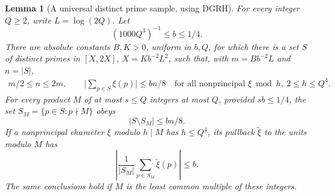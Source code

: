 \documentclass[11pt]{article}
\newtheorem{lemma}[theorem]{Lemma}
\theoremstyle{definition}\newtheorem{remark}[theorem]{Remark}
\newcommand{\abs}[1]{\lvert #1\rvert}
\newcommand{\GRH}{\textup{DGRH}}
\begin{document}
\begin{lemma}[A universal distinct prime sample, using \GRH]\label{lem:sample}
For every integer $Q\ge2$, write $L=\log(2Q)$. Let
\[
 (1000Q^3)^{-1}\le b\le1/4.
\]
There are absolute constants $B,K>0$, uniform in $b,Q$, for which there is a set $S$ of distinct primes in $[X,2X]$, $X=Kb^{-2}L^2$, such that, with $m=Bb^{-2}L$ and $n=|S|$,
\begin{align}
 m/2\le n\le 2m,\qquad
 \abs{\sum_{p\in S}\xi(p)}\le bn/8
 \quad\text{for all nonprincipal }\xi\bmod h,\ 2\le h\le Q^4.\label{eq:sample}
\end{align}
For every product $M$ of at most $s\le Q$ integers at most $Q$, provided $sb\le1/4$, the set $S_M=\{p\in S:p\nmid M\}$ obeys
\begin{equation}\label{eq:remove}
 |S\setminus S_M|\le bn/8.
\end{equation}
If a nonprincipal character $\xi$ modulo $h\mid M$ has $h\le Q^4$, its pullback $\widetilde\xi$ to the units modulo $M$ has
\begin{equation}\label{eq:conditionalbias}
 \left|\frac1{|S_M|}\sum_{p\in S_M}\widetilde\xi(p)\right|\le b.
\end{equation}
The same conclusions hold if $M$ is the least common multiple of these integers.
\end{lemma}
\end{document}
